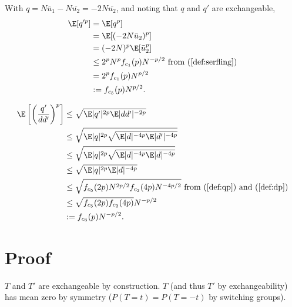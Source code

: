 With $q = N\bar{u}_1 - N\bar{u_2} = -2N\bar{u_2}$, and noting that $q$ and $q'$ are
exchangeable,
\begin{align}
  \E[q'^p] 
  &= \E[q^p] \nonumber \\
  &= \E[(-2N\bar{u}_2)^p] \nonumber \\
  &= (-2N)^p \E[\bar{u}_2^p] \nonumber \\
  &\leq 2^pN^p f_{c_1}(p)N^{-p/2} \text{ from } (\ref{def:serfling})
  \nonumber \\
  &= 2^p f_{c_1}(p)N^{p/2} \nonumber \\
  &:= f_{c_5}(p) N^{p/2} \label{def:qp}.
\end{align}

\begin{align}
  \E \left [ \left ( \frac{q'}{dd'} \right )^p \right ]
  &\leq \sqrt{\E |q'|^{2p} \E |dd'|^{-2p}} \nonumber \\
  &\leq \sqrt{\E |q|^{2p} \sqrt{\E |d|^{-4p} \E |d'|^{-4p}}} \nonumber \\
  &\leq \sqrt{\E |q|^{2p} \sqrt{\E |d|^{-4p} \E |d|^{-4p}}} \nonumber \\
  &\leq \sqrt{\E |q|^{2p} \E |d|^{-4p}} \nonumber \\ 
  &\leq \sqrt{f_{c_5}(2p) N^{2p/2} f_{c_2}(4p) N^{-4p/2}} \text{ from
  } (\ref{def:qp}) \text{ and } (\ref{def:dp}) \nonumber \\
  &\leq \sqrt{f_{c_5}(2p) f_{c_2}(4p)} N^{-p/2} \nonumber \\
  &:= f_{c_6}(p) N^{-p/2} \label{def:qpddp}.
\end{align}

\section{Proof}
$T$ and $T'$ are exchangeable by construction.  $T$ (and thus $T'$ by
exchangeability) has mean zero by symmetry ($P(T = t) = P(T = -t)$ by
switching groups).

